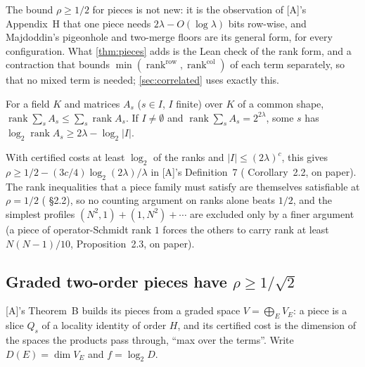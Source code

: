 \documentclass[10pt]{amsart}
\theoremstyle{plain}
\theoremstyle{definition}
\theoremstyle{remark}
\numberwithin{equation}{section}
\newcommand{\A}{\textup{[A]}}
\newcommand{\rk}{\operatorname{rank}}
\begin{document}
\noindent The bound $\rho\ge1/2$ for pieces is not new: it is the observation of \A's Appendix~H that
one piece needs $2\lambda-O(\log\lambda)$ bits row-wise, and Majdoddin's pigeonhole and two-merge floors
\cite[Propositions~4.6 and~4.8]{Maj26} are its general form, for every configuration. What
\cref{thm:pieces} adds is the Lean check of the rank form, and a contraction that bounds
$\min(\rk^{\mathrm{row}},\rk^{\mathrm{col}})$ of each term separately, so that no mixed term is needed;
\cref{sec:correlated} uses exactly this.

\begin{theorem}\label{thm:subadd}
For a field $K$ and matrices $A_s$ ($s\in I$, $I$ finite) over $K$ of a common shape,
$\rk\sum_sA_s\le\sum_s\rk A_s$. If $I\ne\emptyset$ and $\rk\sum_sA_s=2^{2\lambda}$, some $s$ has
$\log_2\rk A_s\ge2\lambda-\log_2|I|$.
\end{theorem}

\noindent With certified costs at least $\log_2$ of the ranks and $|I|\le(2\lambda)^c$, this gives
$\rho\ge1/2-(3c/4)\log_2(2\lambda)/\lambda$ in \A's Definition~7 (
Corollary~2.2, on paper). The rank inequalities that a piece family must satisfy are themselves
satisfiable at $\rho=1/2$ ( \S2.2), so no counting argument on ranks alone
beats $1/2$, and the simplest profiles $(N^2,1)+(1,N^2)+\cdots$ are excluded only by a finer argument
(a piece of operator-Schmidt rank $1$ forces the others to carry rank at least $N(N-1)/10$,
 Proposition~2.3, on paper).

\subsection{Graded two-order pieces have \texorpdfstring{$\rho\ge1/\sqrt2$}{rho >= 1/sqrt 2}}\label{sec:graded}
\A's Theorem~B builds its pieces from a graded space $V=\bigoplus_EV_E$: a piece is a slice $Q_s$ of a
locality identity of order $H$, and its certified cost is the dimension of the spaces the products pass
through, ``max over the terms''. Write $D(E)=\dim V_E$ and $f=\log_2D$.
\end{document}
